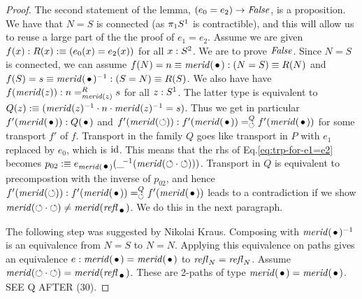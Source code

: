 \documentclass[english,a4]{article}
\begin{document}
\begin{proof}
The second statement of the lemma, $(e_0 = e_2)\to\mathop{\mathit{False}}$, is a proposition.
We have that $N=S$ is connected (as $\pi_1 {S^1}$ is contractible),
and this will allow us to reuse a large part of the the proof of $e_1 = e_2$.
Assume we are given $f(x):R(x)\mathrel{\hbox{:}\mkern-5mu\equiv}(e_0(x)=e_2(x))$ for all $x:S^2$.
We are to prove $\mathop{\mathit{False}}$. Since  $N=S$ is connected, we can assume $f(N)=n\jdeq\mrd(\base):(N=S)\jdeq R(N)$ and 
$f(S)=s\jdeq\mrd(\base)^{-1}:(S=N)\jdeq R(S)$. 
We also have have $f(\mathit{merid}(z)): n=^R_{\mathit{merid}(z)}s$
for all $z:{S^1}$. The latter type is equivalent to
$Q(z)\mathrel{\hbox{:}\mkern-5mu\equiv}(\mathit{merid}(z)^{-1}\cdot n\cdot \mathit{merid}(z)^{-1} = s)$.
Thus we get in particular $f'(\mrd(\base)): Q(\base)$ and 
$f'(\mrd(\Sloop)): f'(\mrd(\base))=^Q_{\Sloop}f'(\mrd(\base))$
for some transport $f'$ of $f$.
Transport in the family $Q$ goes like transport in $P$ with $e_1$
replaced by $e_0$, which is $\mathord{\mathrm{id}}$. 
This means that the rhs of Eq.\ref{eq:trp-for-e1=e2} becomes
$p_{02}\defeq e_{\mrd(\base)}(\_\!^{-1}(\mrd(\Sloop\cdot\Sloop)))$.
Transport in $Q$ is equivalent to precompostion with the inverse of $p_{02}$,
and hence $f'(\mrd(\Sloop)): f'(\mrd(\base))=^Q_{\Sloop}f'(\mrd(\base))$
leads to a contradiction if we show
$\mrd(\Sloop\cdot\Sloop) \neq \mrd(\refl{\base})$.
We do this in the next paragraph.

The following step was suggested by Nikolai Kraus.
Composing with $\mrd(\base)^{-1}$ is an equivalence
from $N=S$ to $N=N$. Applying this equivalence on paths gives an 
equivalence $e: \mrd(\base)=\mrd(\base)$ to $\mathop{{\mathit{refl}}_{N}}=\mathop{{\mathit{refl}}_{N}}$.
Assume $\mrd(\Sloop\cdot\Sloop) = \mrd(\refl{\base})$.
These are 2-paths of type $\mrd(\base)=\mrd(\base)$. 
SEE Q AFTER (30).


\end{proof}


\end{document}
